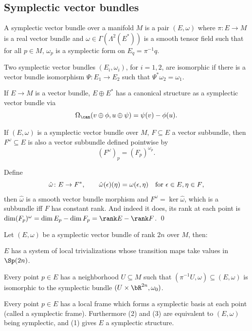 \subsection{Symplectic vector bundles}

\bdefn

    A {\emphcolor symplectic vector bundle} over a manifold $M$ is a pair $(E,\omega)$ where $\pi\colon E\to M$ is a real vector bundle and $\omega\in\Gamma(\Lambda^2(E^*))$
    is a smooth tensor field such that for all $p\in M$, $\omega_p$ is a symplectic form on $E_q=\pi^{-1}q$.

    Two symplectic vector bundles $(E_i,\omega_i)$, for $i=1,2$, are isomorphic if there is a vector bundle isomorphism $\Psi\colon E_1\to E_2$ such that $\Psi^*\omega_2=\omega_1$.

\edefn

\bexam

    If $E\to M$ is a vector bundle, $E\oplus E^*$ has a canonical structure as a symplectic vector bundle via
    $$ \Omega_\can(v\oplus\phi,u\oplus\psi) = \psi(v) - \phi(u) . $$

\eexam

\blemm

    If $(E,\omega)$ is a symplectic vector bundle over $M$, $F\subseteq E$ a vector subbundle, then $F^\omega\subseteq E$ is also a vector subbundle defined pointwise by
    $$ (F^\omega)_p = (F_p)^{\omega_p} . $$

\elemm

\bproof

    Define
    $$ \hat\omega\colon E \to F^*,\qquad \hat\omega(\epsilon)(\eta) = \omega(\epsilon,\eta)\quad\hbox{for $\epsilon\in E,\eta\in F$} , $$
    then $\hat\omega$ is a smooth vector bundle morphism and $F^\omega=\ker\hat\omega$, which is a subbundle iff $F$ has constant rank.
    And indeed it does, its rank at each point is $\dim(F_p)^\omega=\dim E_p-\dim F_p=\rank E-\rank F$.
    \qed

\eproof

\bprop

    Let $(E,\omega)$ be a symplectic vector bundle of rank $2n$ over $M$, then:
    \benum
        \item $E$ has a system of local trivializations whose transition maps take values in $\Sp(2n)$.
        \item Every point $p\in E$ has a neighborhood $U\subseteq M$ such that $(\pi^{-1}U,\omega)\subseteq(E,\omega)$ is isomorphic to the symplectic bundle $(U\times\bR^{2n},\omega_0)$.
        \item Every point $p\in E$ has a local frame which forms a symplectic basis at each point (called a {\emphcolor symplectic frame}).
    \eenum
    Furthermore (2) and (3) are equivalent to $(E,\omega)$ being symplectic, and (1) gives $E$ a symplectic structure.

